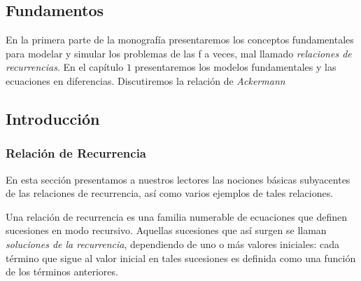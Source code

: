 \begin{partbacktext}
\part{Fundamentos}
En la primera parte de la monografía presentaremos los conceptos fundamentales para modelar y simular los problemas de las f a veces, mal llamado \emph{relaciones de recurrencias}. En el capítulo $1$ presentaremos los modelos fundamentales y las ecuaciones en diferencias. Discutiremos la relación de \emph{Ackermann}
\end{partbacktext}
\chapter{Introducción}
\section{Relación de Recurrencia}
En esta sección presentamos a nuestros lectores las nociones básicas subyacentes de las relaciones de recurrencia, así como varios ejemplos de tales relaciones.

Una relación de recurrencia es una familia numerable de ecuaciones que definen sucesiones en modo recursivo. Aquellas sucesiones que así surgen se llaman \emph{soluciones de la recurrencia}, dependiendo de uno o más valores iniciales: cada término que sigue al valor inicial en tales sucesiones es definida como una función de los términos anteriores.

